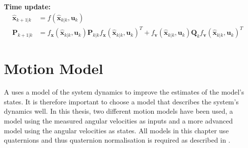 \begin{algorithm}
   \textbf{Time update:}
    \begin{align*}
    \hat{\boldsymbol{x}}_{k+1|k} &= f(\hat{\boldsymbol{x}}_{k|k},\boldsymbol{u}_{k})\\
    \boldsymbol{P}_{k+1|k} &= f_{\boldsymbol{x}}(\hat{\boldsymbol{x}}_{k|k},\boldsymbol{u}_ {k})\boldsymbol{P}_{k|k} f_{\boldsymbol{x}}(\hat{\boldsymbol{x}}_{k|k},\boldsymbol{u}_{k})^{T} + f_{\boldsymbol{v}}(\hat{\boldsymbol{x}}_{k|k},\boldsymbol{u}_{k}) \boldsymbol{Q}_{k} f_{\boldsymbol{v}}(\hat{\boldsymbol{x}}_{k|k},\boldsymbol{u}_{k})^{T}
    \end{align*}    
\end{algorithm}

\section{Motion Model}\label{sec:motion_model}
A \abbrKF uses a model of the system dynamics to improve the estimates of the model's states. It is therefore important to choose a model that describes the system's dynamics well. In this thesis, two different motion models have been used, a model using the measured angular velocities as inputs and a more advanced model using the angular velocities as states. All models in this chapter use quaternions and thus quaternion normalisation is required as described in .

